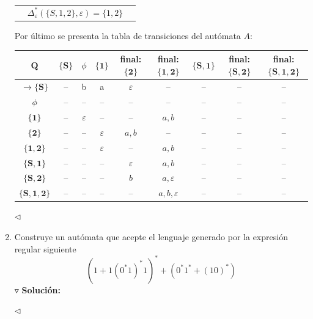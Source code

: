 \documentclass{article}
\begin{document}
\begin{enumerate}
\begin{center}
\begin{tabular}{ c  c  c }
      & $\Delta^{*}_{\varepsilon}\left(\{S,1,2\}, \varepsilon\right) = \{1,2\}$\\
    \end{tabular} 
  \end{center}
  Por último se presenta la tabla de transiciones del autómata $A$:
  \begin{center}
    \begin{tabular}{| c | c | c | c | c | c | c | c | c |}
      \hline
      $\mathbf{Q}$ & $\mathbf{\{S\}}$ & $\phi$ & $\mathbf{\{1\}}$ & final: $\mathbf{\{2\}}$ & final: $\mathbf{\{1,2\}}$ & $\mathbf{\{S,1\}}$ & final: $\mathbf{\{S,2\}}$ & final: $\mathbf{\{S, 1, 2\}}$\\ \hline
      $\rightarrow \mathbf{\{S\}}$ & -- & b & a & $\varepsilon$ & -- & -- & -- & -- \\ \hline
      $\phi$  & -- & -- & -- & -- & -- & --  & -- & -- \\ \hline
      $\mathbf{\{1\}}$  & -- & $\varepsilon$ & -- & -- & $a, b$ & --  & -- & -- \\\hline
      $\mathbf{\{2\}}$  & -- & -- & $\varepsilon$ & $a,b$ & -- & --  & -- & -- \\\hline
      $\mathbf{\{1,2\}}$  & -- & -- & $\varepsilon$ & -- & $a,b$ & -- & -- & -- \\\hline
      $\mathbf{\{S,1\}}$  & -- & -- & -- & $\varepsilon$ & $a,b$ & -- & -- & -- \\\hline
      $\mathbf{\{S,2\}}$  & -- & -- & -- & $b$ & $a, \varepsilon$ & -- & -- & --  \\\hline
      $\mathbf{\{S,1,2\}}$  & -- & -- & -- & -- & $a,b,\varepsilon$ & --  & -- & -- \\\hline
    \end{tabular} 
  \end{center}
  \hfill $\lhd$
\item Construye un autómata que acepte el lenguaje generado por la expresión regular siguiente
  \[
  (1 + 1(0^{*}1)^{*}1)^{*} + (0^{*}1^{*} + (10)^{*})
  \]
  $\triangledown$ \textbf{Solución:}
  
  \hfill $\lhd$
\end{enumerate}
\end{document}
